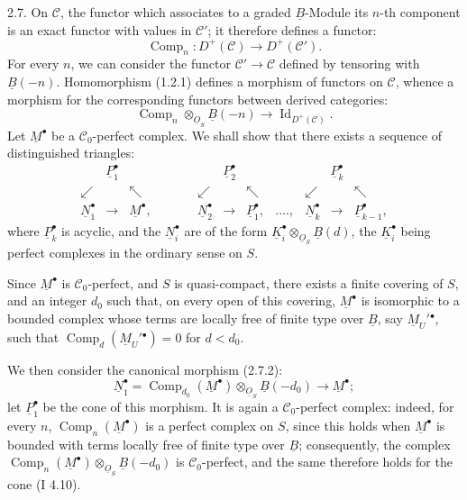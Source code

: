 2.7. On $\mathcal C$, the functor which associates to a graded $\underline{B}$-Module its $n$-th component is an exact functor with values in $\mathcal C'$; it therefore defines a functor:
\begin{equation}\tag{2.7.1}
  \operatorname{Comp}_n:D^+(\mathcal C)\longrightarrow D^+(\mathcal C').
\end{equation}
For every $n$, we can consider the functor $\mathcal C'\to\mathcal C$ defined by tensoring with $\underline{B}(-n)$. Homomorphism (1.2.1) defines a morphism of functors on $\mathcal C$, whence a morphism for the corresponding functors between derived categories:
\begin{equation}\tag{2.7.2}
  \operatorname{Comp}_n\otimes_{\underline{O}_S} \underline{B}(-n)
  \longrightarrow \operatorname{Id}_{D^+(\mathcal C)}.
\end{equation}
Let $\underline{M}^{\bullet}$ be a $\mathcal C_0$-perfect complex. We shall show that there exists a sequence of distinguished triangles:
\[
\begin{array}{ccccccccccc}
& \underline{P}_1^{\bullet} &&&& \underline{P}_2^{\bullet} &&&& \underline{P}_k^{\bullet} & \\
\swarrow && \nwarrow && \swarrow && \nwarrow && \swarrow && \nwarrow \\
\underline{N}_1^{\bullet} & \longrightarrow & \underline{M}^{\bullet}, & \qquad &
\underline{N}_2^{\bullet} & \longrightarrow & \underline{P}_1^{\bullet}, & ...., &
\underline{N}_k^{\bullet} & \longrightarrow & \underline{P}_{k-1}^{\bullet},
\end{array}
\]
where $\underline{P}_k^{\bullet}$ is acyclic, and the $\underline{N}_i^{\bullet}$ are of the form \(\underline{K}_i^{\bullet}\otimes_{\underline{O}_S}\underline{B}(d)\), the $\underline{K}_i^{\bullet}$ being perfect complexes in the ordinary sense on $S$.

Since $\underline{M}^{\bullet}$ is $\mathcal C_0$-perfect, and $S$ is quasi-compact, there exists a finite covering of $S$, and an integer $d_0$ such that, on every open of this covering, $\underline{M}^{\bullet}$ is isomorphic to a bounded complex whose terms are locally free of finite type over $\underline{B}$, say $\underline{M}_U'{}^{\bullet}$, such that $\operatorname{Comp}_d(\underline{M}_U'{}^{\bullet})=0$ for $d<d_0$.

%
We then consider the canonical morphism (2.7.2):
\[
  \underline{N}_1^{\bullet}=\operatorname{Comp}_{d_0}(\underline{M}^{\bullet})\otimes_{\underline{O}_S}\underline{B}(-d_0)
  \longrightarrow \underline{M}^{\bullet};
\]
let $\underline{P}_1^{\bullet}$ be the cone of this morphism. It is again a $\mathcal C_0$-perfect complex: indeed, for every $n$, $\operatorname{Comp}_n(\underline{M}^{\bullet})$ is a perfect complex on $S$, since this holds when $\underline{M}^{\bullet}$ is bounded with terms locally free of finite type over $\underline{B}$; consequently, the complex $\operatorname{Comp}_n(\underline{M}^{\bullet})\otimes_{\underline{O}_S}\underline{B}(-d_0)$ is $\mathcal C_0$-perfect, and the same therefore holds for the cone (I 4.10).

